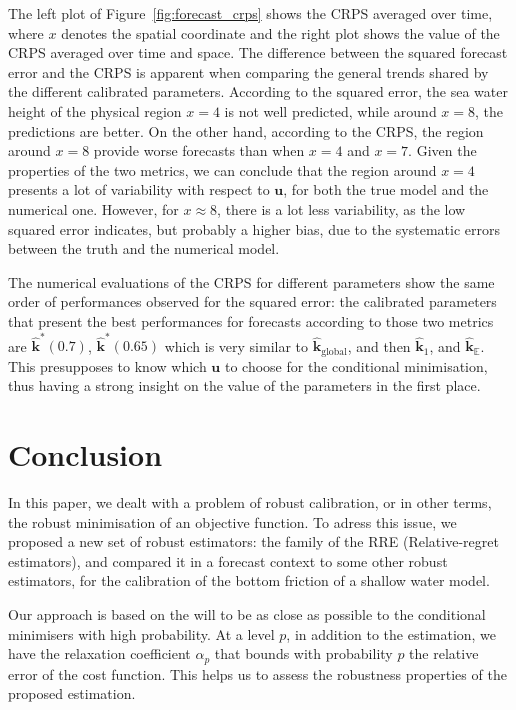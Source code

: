 \documentclass[preprint, 1p]{elsarticle}
\newcommand{\Ex}{\mathbb{E}}
\newcommand{\hatkmean}{\hat{\mathbf{k}}_{\Ex}}
\newcommand{\kest}{\hat{\mathbf{k}}}
\newcommand{\RRE}{RRE}
\begin{document}
The left plot of Figure~\ref{fig:forecast_crps} shows the CRPS averaged over time, where $x$ denotes the spatial coordinate and the right plot shows the value of the CRPS averaged over time and space. The difference between the squared forecast error and the CRPS is apparent when comparing the general trends shared by the different calibrated parameters. According to the squared error, the sea water height of the physical region $x=4$ is not well predicted, while around $x=8$, the predictions are better. On the other hand, according to the CRPS, the region around $x=8$ provide worse forecasts than when $x=4$ and $x=7$. Given the properties of the two metrics,  we can conclude that the region around $x=4$ presents a lot of variability with respect to $\mathbf{u}$, for both the true model and the numerical one. However, for $x \approx 8$, there is a lot less variability, as the low squared error indicates, but probably a higher bias, due to the systematic errors between the truth and the numerical model.


The numerical evaluations of the CRPS for different parameters show the same order of performances observed for the squared error: the calibrated parameters that present the best performances for forecasts according to those two metrics are $\kest^*(0.7)$, $\kest^*(0.65)$ which is very similar to $\kest_{\mathrm{global}}$, and then $\kest_1$, and $\hatkmean$.
This presupposes to know which $\mathbf{u}$ to choose for the conditional minimisation, thus having a strong insight on the value of the parameters in the first place.

\section*{Conclusion}

In this paper, we dealt with a problem of robust calibration, or in other terms, the robust minimisation of an objective function. To adress this issue, we proposed a new set of robust estimators: the family of the \RRE{} (Relative-regret estimators), and compared it in a forecast context to some other robust estimators, for the calibration of the bottom friction of a shallow water model.

Our approach is based on the will to be as close as possible to the conditional minimisers with high probability. At a level $p$, in addition to the estimation, we have the relaxation coefficient $\alpha_p$ that bounds with probability $p$ the relative error of the cost function. This helps us to assess the robustness properties of the proposed estimation.  
\end{document}
